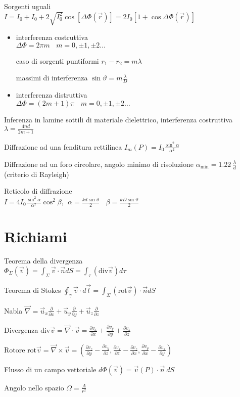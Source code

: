 \documentclass[8pt,a4paper]{article}
\numberwithin{equation}{subsection}
\begin{document}
\begin{multicols}{2}
Sorgenti uguali \\$I=I_{0} +I_{0} +2\sqrt{I^{2}_{0}}\cos[ \Delta \Phi (\vec{r} )] =2I_{0}[ 1+\cos \Delta \Phi (\vec{r} )]$
\begin{itemize}
\item interferenza costruttiva \\$\Delta \Phi =2\pi m\ \ \ \ m=0,\pm 1,\pm 2\dotsc $

caso di sorgenti puntiformi $r_{1} -r_{2} =m\lambda $

massimi di interferenza $\sin \vartheta =m\frac{\lambda }{D}$
\item interferenza distruttiva \\$\Delta \Phi =(2m+1)\pi \ \ \ \ m=0,\pm 1,\pm 2\dotsc $
\end{itemize}

Inferenza in lamine sottili di materiale dielettrico, interferenza costruttiva $\lambda =\frac{4nd}{2m+1}$

Diffrazione ad una fenditura rettilinea $I_{m} (P)=I_{0}\frac{\sin^{2} \alpha }{\alpha ^{2}}$

Diffrazione ad un foro circolare, angolo minimo di risoluzione $\alpha _{\text{min}} =1.22\ \frac{\lambda }{d}$ (criterio di Rayleigh)

Reticolo di diffrazione \\$I=4I_{0}\frac{\sin^{2} \alpha }{\alpha ^{2}}\cos^{2} \beta ,\ \ \alpha =\frac{kd\sin \vartheta }{2} \ \ \ \ \beta =\frac{kD\sin \vartheta }{2}$
\section*{Richiami}

Teorema della divergenza \\$\Phi _{\Sigma } (\vec{v} )=\int _{\Sigma }\vec{v} \cdot \vec{n} dS=\int _{\tau } (\text{div}\vec{v} )d\tau $

Teorema di Stokes $\oint _{\gamma }\vec{v} \cdot d\vec{l} =\int _{\Sigma } (\text{rot}\vec{v} )\cdot \vec{n} dS$

Nabla $\vec{\nabla } =\vec{u}_{x}\frac{\partial }{\partial x} +\vec{u}_{y}\frac{\partial }{\partial y} +\vec{u}_{z}\frac{\partial }{\partial z}$

Divergenza $\text{div}\vec{v} =\vec{\nabla } \cdot \vec{v} =\frac{\partial v_{x}}{\partial x} +\frac{\partial v_{y}}{\partial y} +\frac{\partial v_{z}}{\partial z}$

Rotore $\text{rot}\vec{v} =\vec{\nabla } \times \vec{v} =\left(\frac{\partial v_{z}}{\partial y} -\frac{\partial v_{y}}{\partial z} ,\frac{\partial v_{x}}{\partial z} -\frac{\partial v_{z}}{\partial x} ,\frac{\partial v_{y}}{\partial x} -\frac{\partial v_{x}}{\partial y}\right)$

Flusso di un campo vettoriale $d\Phi (\vec{v} )=\vec{v} (P)\cdot \vec{n} \ dS$

Angolo nello spazio $\Omega =\frac{A}{r^{2}}$

\end{multicols}
\end{document}
